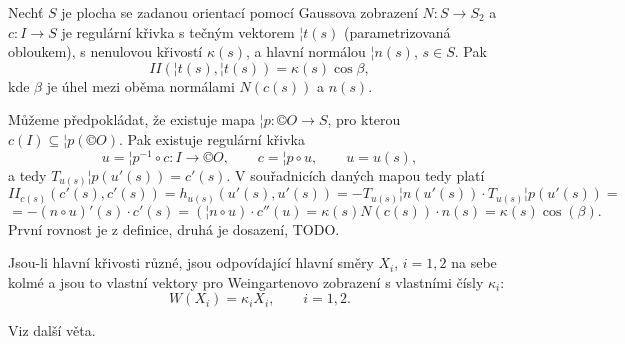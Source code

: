 \documentclass[12pt]{article}                   %
\begin{document}
        \begin{veta}[Meusnier]
            Nechť $S$ je plocha se zadanou orientací pomocí Gaussova zobrazení $N: S \rightarrow S_2$ a $c: I \rightarrow S$ je regulární křivka s tečným vektorem $¦t(s)$ (parametrizovaná obloukem), s nenulovou křivostí $\kappa(s)$, a hlavní normálou $¦n(s)$, $s \in S$. Pak
            $$ II(¦t(s), ¦t(s)) = \kappa(s) \cos \beta, $$
            kde $\beta$ je úhel mezi oběma normálami $N(c(s))$ a $n(s)$.

            \begin{dukazin}
                Můžeme předpokládat, že existuje mapa $¦p: ©O \rightarrow S$, pro kterou $c(I) \subseteq ¦p(©O)$. Pak existuje regulární křivka
                $$ u = ¦p^{-1} \circ c: I \rightarrow ©O, \qquad c = ¦p \circ u, \qquad u = u(s), $$
                a tedy $T_{u(s)}¦p(u'(s)) = c'(s)$. V souřadnicích daných mapou tedy platí
                $$ II_{c(s)}(c'(s), c'(s)) = h_{u(s)}(u'(s), u'(s)) = -T_{u(s)}¦n(u'(s))·T_{u(s)}¦p(u'(s)) = $$
                $$ = -(n\circ u)'(s)·c'(s) = (¦n \circ u) · c''(u) = \kappa(s)N(c(s))·n(s) = \kappa(s)\cos(\beta) . $$
                První rovnost je z definice, druhá je dosazení, TODO.
            \end{dukazin}
        \end{veta}

        \begin{veta}
            Jsou-li hlavní křivosti různé, jsou odpovídající hlavní směry $X_i$, $i = 1, 2$ na sebe kolmé a jsou to vlastní vektory pro Weingartenovo zobrazení s vlastními čísly $\kappa_i$:
            $$ W(X_i) = \kappa_iX_i, \qquad i = 1, 2. $$

            \begin{dukazin}
                Viz další věta.
            \end{dukazin}
        \end{veta}
\end{document}
